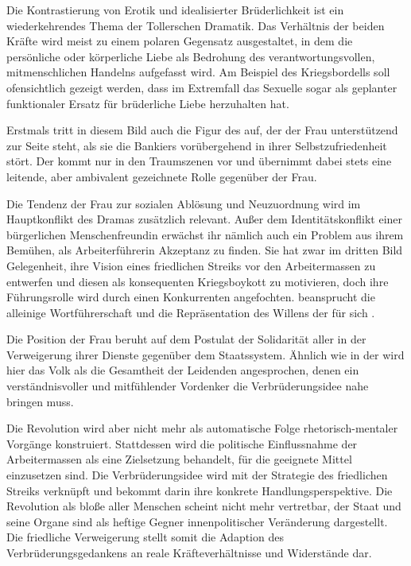 Die Kontrastierung von Erotik und idealisierter Brüderlichkeit ist ein
wiederkehrendes Thema der Tollerschen Dramatik. Das Verhältnis der beiden
Kräfte wird meist zu einem polaren Gegensatz ausgestaltet, in dem die
persönliche oder  körperliche Liebe als Bedrohung des
verantwortungsvollen, mitmenschlichen Handelns aufgefasst wird. Am
Beispiel des Kriegsbordells soll ofensichtlich gezeigt werden, dass im
Extremfall das Sexuelle sogar als geplanter funktionaler Ersatz für
brüderliche Liebe herzuhalten hat.

Erstmals tritt in diesem Bild auch die Figur des \Cite{Begleiters} auf, der der
Frau unterstützend zur Seite steht, als sie die Bankiers
vorübergehend in ihrer Selbstzufriedenheit stört. Der \Cite{Begleiter}
kommt nur in den Traumszenen vor und übernimmt dabei stets eine leitende, aber
ambivalent gezeichnete Rolle gegenüber der
  Frau.


Die Tendenz der Frau zur sozialen Ablösung und Neuzuordnung wird im
Hauptkonflikt des Dramas zusätzlich relevant. Außer dem Identitätskonflikt
einer bürgerlichen Menschenfreundin erwächst ihr nämlich auch ein Problem aus
ihrem Bemühen, als Arbeiterführerin Akzeptanz zu finden. Sie hat zwar im
dritten Bild Gelegenheit, ihre Vision eines friedlichen Streiks vor den
Arbeitermassen zu entwerfen und diesen als konsequenten Kriegsboykott zu
motivieren, doch ihre Führungsrolle wird durch einen Konkurrenten
angefochten. \Cite{Der Namenlose} beansprucht die alleinige Wortführerschaft
und die Repräsentation des Willens der \Cite{Masse} für sich . 

Die Position der Frau beruht auf dem Postulat der Solidarität aller
\Cite{Schwachen}  in der Verweigerung ihrer Dienste gegenüber dem
Staatssystem. Ähnlich wie in der  wird hier das Volk als die
Gesamtheit der Leidenden angesprochen, denen ein verständnisvoller und
mitfühlender Vordenker die Verbrüderungsidee nahe bringen muss. 

Die Revolution wird aber nicht mehr als automatische Folge rhetorisch-mentaler
Vorgänge konstruiert. Stattdessen wird die politische Einflussnahme der
Arbeitermassen als eine Zielsetzung behandelt, für die geeignete Mittel
einzusetzen sind. Die Verbrüderungsidee wird mit der Strategie des friedlichen
Streiks verknüpft und bekommt darin ihre konkrete Handlungsperspektive.
Die Revolution als bloße \Cite{Erweckung} aller Menschen scheint nicht mehr vertretbar,
der Staat und seine Organe sind als heftige Gegner innenpolitischer Veränderung
dargestellt. Die friedliche Verweigerung stellt somit die Adaption des
Verbrüderungsgedankens an reale Kräfteverhältnisse und Widerstände dar. 

